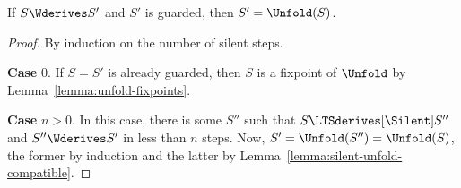 \begin{lemma}\label{lemma:app:silent-unfold}
  If $S \Wderives S'$ and $S'$ is guarded, then $S' = \Unfold (S)$.
\end{lemma}
\begin{proof}
  By induction on the number of silent steps.

  \textbf{Case }$0$. If $S=S'$ is already guarded, then $S$ is a
  fixpoint of $\Unfold$  by Lemma~\ref{lemma:unfold-fixpoints}.

  \textbf{Case }$n>0$. In this case, there is some $S''$ such that $S
  \LTSderives[\Silent] S''$ and $S'' \Wderives S'$ in less than $n$
  steps. Now, $S' = \Unfold (S'') = \Unfold (S)$, the former by
  induction  and the latter by
  Lemma~\ref{lemma:silent-unfold-compatible}.
\end{proof}


